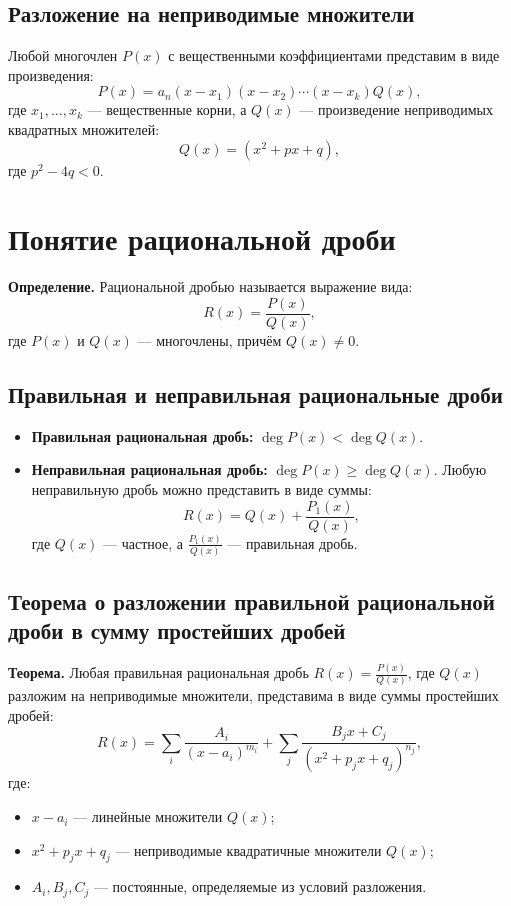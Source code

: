 \documentclass{article}
\begin{document}
\subsection*{Разложение на неприводимые множители}
Любой многочлен \( P(x) \) с вещественными коэффициентами представим в виде произведения:
\[
P(x) = a_n (x - x_1)(x - x_2) \cdots (x - x_k) Q(x),
\]
где \( x_1, \dots, x_k \) — вещественные корни, а \( Q(x) \) — произведение неприводимых квадратных множителей:
\[
Q(x) = (x^2 + px + q),
\]
где \( p^2 - 4q < 0 \).

\section*{Понятие рациональной дроби}
\textbf{Определение.} Рациональной дробью называется выражение вида:
\[
R(x) = \frac{P(x)}{Q(x)},
\]
где \( P(x) \) и \( Q(x) \) — многочлены, причём \( Q(x) \neq 0 \).

\subsection*{Правильная и неправильная рациональные дроби}
\begin{itemize}
    \item \textbf{Правильная рациональная дробь:} \( \deg P(x) < \deg Q(x) \).
    \item \textbf{Неправильная рациональная дробь:} \( \deg P(x) \geq \deg Q(x) \). Любую неправильную дробь можно представить в виде суммы:
    \[
    R(x) = Q(x) + \frac{P_1(x)}{Q(x)},
    \]
    где \( Q(x) \) — частное, а \( \frac{P_1(x)}{Q(x)} \) — правильная дробь.
\end{itemize}

\subsection*{Теорема о разложении правильной рациональной дроби в сумму простейших дробей}
\textbf{Теорема.} Любая правильная рациональная дробь \( R(x) = \frac{P(x)}{Q(x)} \), где \( Q(x) \) разложим на неприводимые множители, представима в виде суммы простейших дробей:
\[
R(x) = \sum_{i} \frac{A_i}{(x - a_i)^{m_i}} + \sum_{j} \frac{B_j x + C_j}{(x^2 + p_j x + q_j)^{n_j}},
\]
где:
\begin{itemize}
    \item \( x - a_i \) — линейные множители \( Q(x) \);
    \item \( x^2 + p_j x + q_j \) — неприводимые квадратичные множители \( Q(x) \);
    \item \( A_i, B_j, C_j \) — постоянные, определяемые из условий разложения.
\end{itemize}
\end{document}
